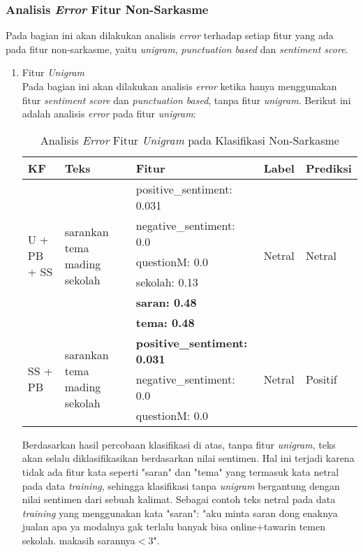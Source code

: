 \subsubsection{Analisis \textit{Error} Fitur Non-Sarkasme}
Pada bagian ini akan dilakukan analisis \textit{error }terhadap setiap fitur yang ada pada fitur non-sarkasme, yaitu \textit{unigram}, \textit{punctuation based} dan \textit{sentiment score}.
\begin{enumerate}[leftmargin=*,nolistsep]
	\item Fitur \textit{Unigram}\\
	Pada bagian ini akan dilakukan analisis \textit{error} ketika hanya menggunakan fitur \textit{sentiment score} dan \textit{punctuation based}, tanpa fitur \textit{unigram}. Berikut ini adalah analisis \textit{error} pada fitur \textit{unigram}:
	
	\begin{table}[H]
		\caption{Analisis \textit{Error} Fitur \textit{Unigram} pada Klasifikasi Non-Sarkasme}
		\centering
		\small
		\begin{adjustbox}{width=1\textwidth}
		\begin{tabular}{|p{1.7cm}|p{3.15cm}|p{4.3cm}|p{1cm}|p{1.3cm}|}
			\hline
			\textbf{KF} & \textbf{Teks} & \textbf{Fitur} & \textbf{Label} & \textbf{Prediksi} \\
			\hline
			\multirow{6}{*}{\parbox{1.7cm}{U + PB + SS}}& \multirow{6}{*}{\parbox{3.15cm}{sarankan tema mading sekolah}} & positive\_sentiment: 0.031 
			& \multirow{6}{*}{\parbox{1cm}{Netral}} & \multirow{6}{*}{\parbox{1.3cm}{Netral}} \\
			\cline{3-3}
			& & negative\_sentiment: 0.0 & & \\
			\cline{3-3}
			& & questionM: 0.0 & & \\
			\cline{3-3}
			& & sekolah: 0.13 & & \\
			\cline{3-3}
			& & \textbf{saran: 0.48} & & \\
			\cline{3-3}
			& & \textbf{tema: 0.48} & & \\
			\hline
			\multirow{3}{*}{\parbox{1.7cm}{SS + PB}} & \multirow{3}{*}{\parbox{3.15cm}{sarankan tema mading sekolah}} & \textbf{positive\_sentiment: 
				0.031} & \multirow{3}{*}{\parbox{1cm}{Netral}} & \multirow{3}{*}{\parbox{1.3cm}{Positif}} \\
			\cline{3-3}
			& & negative\_sentiment: 0.0 & & \\
			\cline{3-3}
			& & questionM: 0.0 & & \\
			\hline
		\end{tabular}
		\end{adjustbox}
	\end{table}
	Berdasarkan hasil percobaan klasifikasi di atas, tanpa fitur \textit{unigram}, teks akan selalu diklasifikasikan berdasarkan nilai sentimen. Hal ini terjadi karena tidak ada fitur kata seperti "saran" dan "tema" yang termasuk kata netral pada data \textit{training}, sehingga klasifikasi tanpa \textit{unigram} bergantung dengan nilai sentimen dari sebuah kalimat. Sebagai contoh teks netral 
	pada data \textit{training} yang menggunakan kata "saran": "aku minta saran dong enaknya jualan apa ya modalnya gak terlalu banyak bisa online+tawarin temen sekolah. makasih sarannya$<$3".
	

\end{enumerate}
